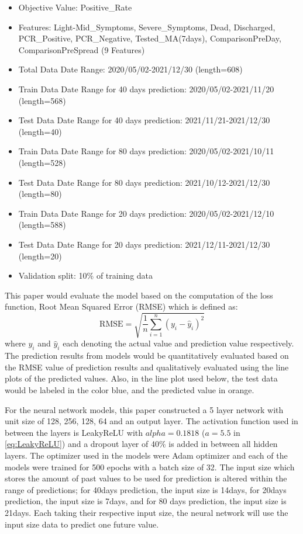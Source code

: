 \begin{itemize}
    \item Objective Value: Positive\_Rate
    \item Features: Light-Mid\_Symptoms, Severe\_Symptoms, Dead,
       Discharged, PCR\_Positive, PCR\_Negative, Tested\_MA(7days),
       ComparisonPreDay, ComparisonPreSpread (9 Features)
    \item Total Data Date Range: 2020/05/02-2021/12/30 (length=608)
    \item Train Data Date Range for 40 days prediction: 2020/05/02-2021/11/20 (length=568)
    \item Test Data Date Range for 40 days prediction: 2021/11/21-2021/12/30 (length=40)
    \item Train Data Date Range for 80 days prediction: 2020/05/02-2021/10/11 (length=528)
    \item Test Data Date Range for 80 days prediction: 2021/10/12-2021/12/30 (length=80)
    \item Train Data Date Range for 20 days prediction: 2020/05/02-2021/12/10 (length=588)
    \item Test Data Date Range for 20 days prediction: 2021/12/11-2021/12/30 (length=20)
    \item Validation split: 10\% of training data

\end{itemize}

This paper would evaluate the model based on the computation of the loss function, Root Mean Squared Error (RMSE) which is defined as:
\begin{equation}\label{eq:RMSE}
    \mathrm{RMSE}=\sqrt{\frac{1}{n} \sum_{i=1}^{n}\left(y_{i}-\hat{y}_{i}\right)^{2}}
\end{equation}
where $y_{i}$ and $\hat{y}_{i}$ each denoting the actual value and prediction value respectively. The prediction results from models would be quantitatively evaluated based on the RMSE value of prediction results and qualitatively evaluated using the line plots of the predicted values. Also, in the line plot used below, the test data would be labeled in the color blue, and the predicted value in orange. 

For the neural network models, this paper constructed a 5 layer network with unit size of 128, 256, 128, 64 and an output layer. The activation function used in between the layers is LeakyReLU \citep{LeakyReLU} with $alpha=0.1818$ ($a=5.5$ in \ref{eq:LeakyReLU}) and a dropout layer of 40\% is added in between all hidden layers. The optimizer used in the models were Adam optimizer and each of the models were trained for 500 epochs with a batch size of 32. The input size which stores the amount of past values to be used for prediction is altered within the range of predictions; for 40days prediction, the input size is 14days, for 20days prediction, the input size is 7days, and for 80 days prediction, the input size is 21days. Each taking their respective input size, the neural network will use the input size data to predict one future value. 

